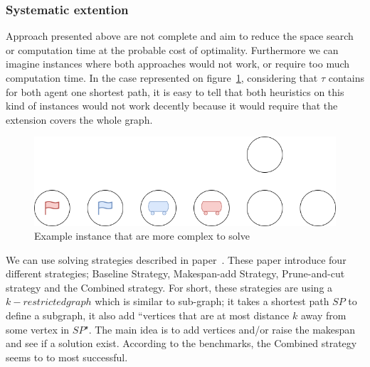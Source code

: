 \subsubsection{Systematic extention}

Approach presented above are not complete and aim to reduce the space search or computation time at the probable cost of optimality. Furthermore we can imagine instances where both approaches would not work, or require too much computation time. In the case represented on figure~\ref{img:systemetic_instance}, considering that \(\tau\) contains for both agent one shortest path, it is easy to tell that both heuristics on this kind of instances would not work decently because it would require that the extension covers the whole graph.

\begin{figure}[H]
  \centering
  \caption{Example instance that are more complex to solve}\label{img:systemetic_instance}
  \includegraphics[width=\widthimg]{img/systematic_instance.drawio.png}
\end{figure}

We can use solving strategies described in paper~\cite{husvobbass22a,husvobbass22b}. These paper introduce four different strategies; Baseline Strategy,  Makespan-add Strategy, Prune-and-cut strategy and the Combined strategy. For short, these strategies are using a \(k-restricted graph\) which is similar to sub-graph; it takes a shortest path \(SP\) to define a subgraph, it also add ``vertices that are at most distance \(k\) away from some vertex in \(SP\)". The main idea is to add vertices and/or raise the makespan and see if a solution exist. According to the benchmarks, the Combined strategy seems to to most successful.






